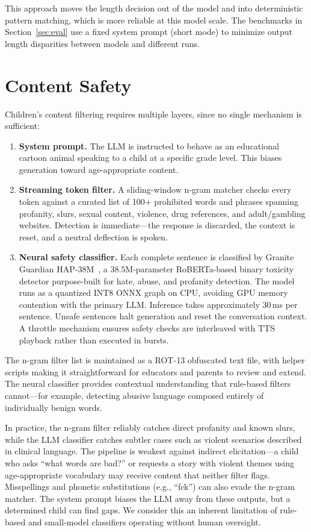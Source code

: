 \documentclass[11pt]{article}
\begin{document}
\noindent This approach moves the length decision out of the model and into deterministic pattern matching,
which is more reliable at this model scale.
The benchmarks in Section~\ref{sec:eval} use a fixed system prompt (short mode) to minimize output length disparities between models and different runs.

\section{Content Safety}\label{sec:safety}

Children's content filtering requires multiple layers, since no single mechanism is sufficient:

\begin{enumerate}[nosep]
  \item \textbf{System prompt.}
    The LLM is instructed to behave as an educational cartoon animal speaking to a child at a specific grade level.
    This biases generation toward age-appropriate content.
  \item \textbf{Streaming token filter.}
    A sliding-window n-gram matcher checks every token against a curated list of 100+ prohibited words and phrases
    spanning profanity, slurs, sexual content, violence, drug references, and adult/gambling websites.
    Detection is immediate---the response is discarded, the context is reset, and a neutral deflection is spoken.
  \item \textbf{Neural safety classifier.}
    Each complete sentence is classified by Granite Guardian HAP-38M~\cite{padhi2024graniteguardian},
    a 38.5M-parameter RoBERTa-based binary toxicity detector purpose-built for hate, abuse, and profanity detection.
    The model runs as a quantized INT8 ONNX graph on CPU, avoiding GPU memory contention with the primary LLM.
    Inference takes approximately 30\,ms per sentence.
    Unsafe sentences halt generation and reset the conversation context.
    A throttle mechanism ensures safety checks are interleaved with TTS playback rather than executed in bursts.
\end{enumerate}

\noindent The n-gram filter list is maintained as a ROT-13 obfuscated text file,
with helper scripts making it straightforward for educators and parents to review and extend.
The neural classifier provides contextual understanding that rule-based filters cannot---for example,
detecting abusive language composed entirely of individually benign words.

In practice, the n-gram filter reliably catches direct profanity and known slurs,
while the LLM classifier catches subtler cases such as violent scenarios described in clinical language.
The pipeline is weakest against indirect elicitation---a child who asks ``what words are bad?''
or requests a story with violent themes using age-appropriate vocabulary may receive content that neither filter flags.
Misspellings and phonetic substitutions (e.g., ``fck'') can also evade the n-gram matcher.
The system prompt biases the LLM away from these outputs, but a determined child can find gaps.
We consider this an inherent limitation of rule-based and small-model classifiers operating without human oversight.
\end{document}
